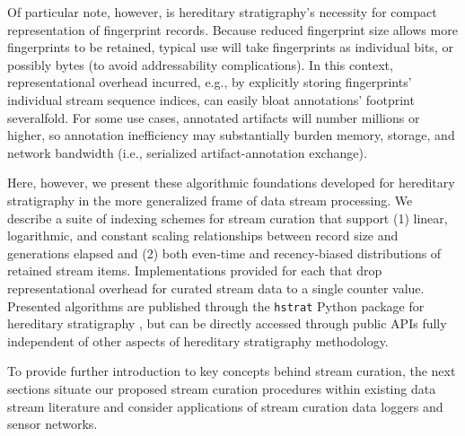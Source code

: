 Of particular note, however, is hereditary stratigraphy's necessity for compact representation of fingerprint records.
Because reduced fingerprint size allows more fingerprints to be retained, typical use will take fingerprints as individual bits, or possibly bytes (to avoid addressability complications).
In this context, representational overhead incurred, e.g., by explicitly storing fingerprints' individual stream sequence indices, can easily bloat annotations' footprint severalfold.
For some use cases, annotated artifacts will number millions or higher, so annotation inefficiency may substantially burden memory, storage, and network bandwidth (i.e., serialized artifact-annotation exchange).

Here, however, we present these algorithmic foundations developed for hereditary stratigraphy in the more generalized frame of data stream processing.
We describe a suite of indexing schemes for stream curation that support (1) linear, logarithmic, and constant scaling relationships between record size and generations elapsed and (2) both even-time and recency-biased distributions of retained stream items.
Implementations provided for each that drop representational overhead for curated stream data to a single counter value.
Presented algorithms are published through the \texttt{hstrat} Python package for hereditary stratigraphy \citep{moreno2022hstrat}, but can be directly accessed through public APIs fully independent of other aspects of hereditary stratigraphy methodology.

To provide further introduction to key concepts behind stream curation, the next sections situate our proposed stream curation procedures within existing data stream literature and consider applications of stream curation data loggers and sensor networks.
